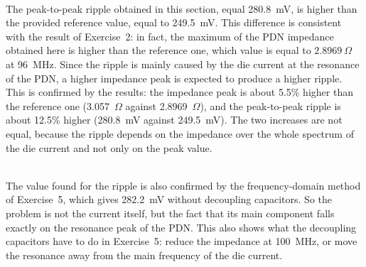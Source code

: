 \noindent\\ The peak-to-peak ripple obtained in this section, equal 280.8~mV, is higher than
the provided reference value, equal to 249.5~mV. This difference is consistent with the result of
Exercise~2: in fact, the maximum of the PDN impedance obtained here is higher than the reference one,
which value is equal to $2.8969~\Omega$ at 96~MHz. Since the ripple is mainly caused by the die current at the
resonance of the PDN, a higher impedance peak is expected to produce a higher ripple.\\
This is confirmed by the results: the impedance peak is about 5.5\%
higher than the reference one (3.057~$\Omega$ against 2.8969~$\Omega$),
and the peak-to-peak ripple is about 12.5\% higher (280.8~mV against
249.5~mV). The two increases are not equal, because the ripple depends
on the impedance over the whole spectrum of the die current and not only
on the peak value.

\noindent\\ The value found for the ripple is also confirmed by the
frequency-domain method of Exercise~5, which gives 282.2~mV without
decoupling capacitors.
So the problem is not the current itself, but the fact that its main component falls exactly on the resonance peak of the PDN. This also shows
what the decoupling capacitors have to do in Exercise~5: reduce the impedance at 100~MHz, or move the resonance away from the main frequency of the
die current.